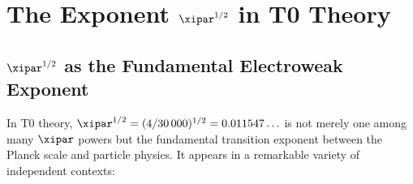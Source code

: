 \clearpage

\section{The Exponent \texorpdfstring{$\xipar^{1/2}$}{xi\^{}(1/2)} in T0 Theory}
\label{sec:xi_half}

\subsection{%
  \texorpdfstring{$\xipar^{1/2}$}{xi\^{}(1/2)} as the Fundamental
  Electroweak Exponent}

In T0 theory, $\xipar^{1/2} = (4/30\,000)^{1/2} = 0.011547\ldots$ is not
merely one among many $\xipar$ powers but the fundamental transition exponent
between the Planck scale and particle physics. It appears in a remarkable
variety of independent contexts:

\begin{table}[H]
    \centering
    \caption{The exponent $\xipar^{1/2} = 0.011547$ as the universal
    electroweak exponent in T0 theory. It marks the geometric transition
    from the Planck world to the particle-physics scale. The PPLN dispersion
    joins the same hierarchy as $\alpha_W$ and $m_e/m_\mu$.}
    \label{tab:xi12}
\end{table}

